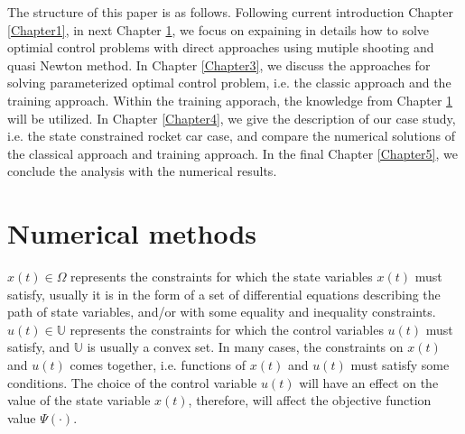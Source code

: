 \documentclass  [
  paper    = a4,
  BCOR     = 10mm,
  twoside,
  fontsize = 12pt,
  fleqn,
  toc      = bibnumbered,
  toc      = listofnumbered,
  numbers  = noendperiod,
  headings = normal,
  listof   = leveldown,
  version  = 3.03
]                                       {scrreprt}
\newcommand{\<}{\langle}
\renewcommand{\>}{\rangle}
\begin{document}
The structure of this paper is as follows. Following current introduction Chapter \ref{Chapter1}, in next Chapter \ref{Chapter2}, we focus on expaining in details how to solve optimial control problems with direct approaches using mutiple shooting and quasi Newton method.  In Chapter \ref{Chapter3}, we discuss the approaches for solving parameterized optimal control problem, i.e. the classic approach and the training approach.  Within the training apporach, the knowledge from Chapter \ref{Chapter2} will be utilized. In Chapter \ref{Chapter4}, we give the description of our case study, i.e. the state constrained rocket car case, and compare the numerical solutions of the classical approach and training approach. In the final Chapter \ref{Chapter5}, we conclude the analysis with the numerical results. 



\chapter{Numerical methods}
\label{Chapter2}


 
 
$x(t) \in \Omega$ represents the constraints for which the state variables $x(t)$ must satisfy, usually it is in the form of a set of differential equations describing the path of state variables, and/or with some equality and inequality constraints. $ u(t) \in \mathbb{U}$ represents the constraints for which the control variables $u(t)$ must satisfy, and $\mathbb{U}$ is usually a convex set. In many cases, the constraints on $x(t)$ and $u(t)$ comes together, i.e. functions of $x(t)$ and $u(t)$ must satisfy some conditions. The choice of the control variable $u(t)$ will have an effect on the value of the state variable $x(t)$, therefore, will affect the objective function value $\Psi(\cdot)$. 
\end{document}
